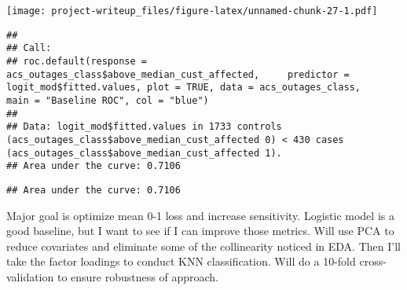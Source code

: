 \documentclass[
]{article}
\newenvironment{Shaded}{\begin{snugshade}}{\end{snugshade}}
\newcommand{\CommentTok}[1]{\textcolor[rgb]{0.56,0.35,0.01}{\textit{#1}}}
\newcommand{\DataTypeTok}[1]{\textcolor[rgb]{0.13,0.29,0.53}{#1}}
\newcommand{\KeywordTok}[1]{\textcolor[rgb]{0.13,0.29,0.53}{\textbf{#1}}}
\newcommand{\NormalTok}[1]{#1}
\newcommand{\OperatorTok}[1]{\textcolor[rgb]{0.81,0.36,0.00}{\textbf{#1}}}
\newcommand{\OtherTok}[1]{\textcolor[rgb]{0.56,0.35,0.01}{#1}}
\newcommand{\StringTok}[1]{\textcolor[rgb]{0.31,0.60,0.02}{#1}}
\begin{document}
\begin{Shaded}
\end{Shaded}

\texttt{[image: project-writeup\_files/figure-latex/unnamed-chunk-27-1.pdf]}

\begin{verbatim}
## 
## Call:
## roc.default(response = acs_outages_class$above_median_cust_affected,     predictor = logit_mod$fitted.values, plot = TRUE, data = acs_outages_class,     main = "Baseline ROC", col = "blue")
## 
## Data: logit_mod$fitted.values in 1733 controls (acs_outages_class$above_median_cust_affected 0) < 430 cases (acs_outages_class$above_median_cust_affected 1).
## Area under the curve: 0.7106
\end{verbatim}

\begin{Shaded}
\end{Shaded}

\begin{verbatim}
## Area under the curve: 0.7106
\end{verbatim}

Major goal is optimize mean 0-1 loss and increase sensitivity. Logistic
model is a good baseline, but I want to see if I can improve those
metrics. Will use PCA to reduce covariates and eliminate some of the
collinearity noticed in EDA. Then I'll take the factor loadings to
conduct KNN classification. Will do a 10-fold cross-validation to ensure
robustness of approach.
\end{document}
